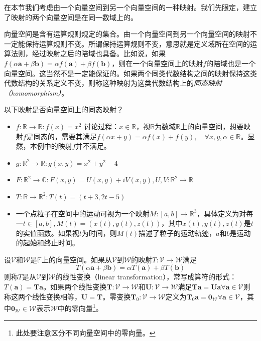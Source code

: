 \documentclass[main.tex]{subfiles}
\begin{document}
在本节我们考虑由一个向量空间到另一个向量空间的一种映射。我们先限定，建立了映射的两个向量空间是在同一数域上的。

向量空间是含有运算规则规定的集合。由一个向量空间到另一个向量空间的映射不一定能保持运算规则不变。所谓保持运算规则不变，意思就是定义域所在空间的运算法则，经过映射之后的陪域也具备。比如说，如果$f\left(\alpha\mathbf{a}+\beta\mathbf{b}\right)=\alpha f\left(\mathbf{a}\right)+\beta f\left(\mathbf{b}\right)$，则在一个向量空间上的映射$f$的陪域也是一个向量空间。这当然不是一定能保证的。如果两个同类代数结构之间的映射保持这类代数结构的关系定义不变，则称这种映射为这类代数结构上的\emph{同态映射（homomorphism）}。
\begin{example}
    以下映射是否向量空间上的同态映射？
    \begin{itemize}
        \item $f:\mathbb{R}\rightarrow\mathbb{R}:f\left(x\right)=x^2$
              讨论过程：$x\in\mathbb{R}$，视$\mathbb{R}$为数域$\mathbb{R}$上的向量空间，想要映射$f$是同态的，需要其满足$f\left(\alpha x+ y\right)=\alpha f\left(x\right)+f\left(y\right),\quad\forall x,y,\alpha\in\mathbb{R}$。显然，本例中的映射$f$并不满足。
        \item $g:\mathbb{R}^2\rightarrow\mathbb{R}:g\left(x,y\right)=x^2+y^2-4$
        \item $F:\mathbb{R}^2\rightarrow\mathbb{C}:F\left(x,y\right)=U\left(x,y\right)+iV\left(x,y\right),U,V:\mathbb{R}^2\rightarrow\mathbb{R}$
        \item $T:\mathbb{R}\rightarrow\mathbb{R}^2:T\left(t\right)=\left(t+3,2t-5\right)$
        \item 一个点粒子在空间中的运动可视为一个映射$M:\left[a,b\right]\rightarrow\mathbb{R}^3$，具体定义为对每一$t\in\left[a,b\right],M\left(t\right)=\left(x\left(t\right),y\left(t\right),z\left(t\right)\right)$，其中$x\left(t\right),y\left(t\right),z\left(t\right)$是$t$的实值函数。如果视$t$为时间，则$M\left(t\right)$描述了粒子的运动轨迹，$a$和$b$是运动的起始和终止时间。
    \end{itemize}
\end{example}

\begin{definition}[线性变换]\label{def:II.2.11}
    设$\mathcal{V}$和$\mathcal{W}$是$\mathbb{F}$上的向量空间。如果从$\mathcal{V}$到$\mathcal{W}$的映射$T:\mathcal{V}\rightarrow\mathcal{W}$满足
    \[T\left(\alpha\mathbf{a}+\beta\mathbf{b}\right)=\alpha T\left(\mathbf{a}\right)+\beta T\left(\mathbf{b}\right)\]
    则称$T$是从$\mathcal{V}$到$\mathcal{W}$的线性变换（linear transformation），常写成算符的形式：$T\left(\mathbf{a}\right)=\mathbf{Ta}$。如果两个线性变换$\mathbf{T}:\mathcal{V}\rightarrow\mathcal{W}$和$\mathbf{U}:\mathcal{V}\rightarrow\mathcal{W}$满足$\mathbf{Ta}=\mathbf{Ua}\forall\mathbf{a}\in\mathcal{V}$则称这两个线性变换相等，$\mathbf{U}=\mathbf{T}$。零变换$\mathbf{T}_0:\mathcal{V}\rightarrow\mathcal{W}$定义为$\mathbf{T}_0\mathbf{a}=\mathbf{0}_\mathcal{W}\forall\mathbf{a}\in\mathcal{V}$，其中$\mathbf{0}_\mathcal{W}\in\mathcal{W}$表示$\mathcal{W}$中的零向量\footnote{此处要注意区分不同向量空间中的零向量。}。
\end{definition}
\end{document}
